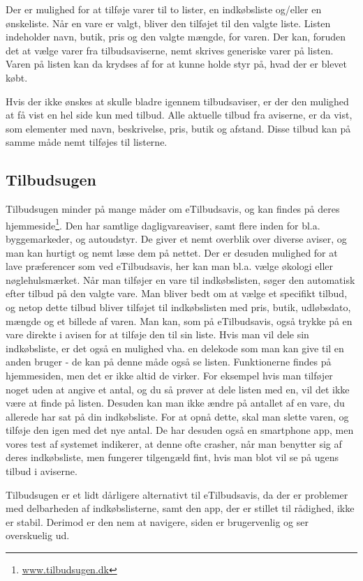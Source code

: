 Der er mulighed for at tilføje varer til to lister, en indkøbsliste og/eller en ønskeliste.
Når en vare er valgt, bliver den tilføjet til den valgte liste.
Listen indeholder navn, butik, pris og den valgte mængde, for varen.
Der kan, foruden det at vælge varer fra tilbudsaviserne, nemt skrives generiske varer på listen. Varen på listen kan da krydses af for at kunne holde styr på, hvad der er blevet købt.

Hvis der ikke ønskes at skulle bladre igennem tilbudsaviser, er der den mulighed at få vist en hel side kun med tilbud.
Alle aktuelle tilbud fra aviserne, er da vist, som elementer med navn, beskrivelse, pris, butik og afstand. 
Disse tilbud kan på samme måde nemt tilføjes til listerne.

\subsection{Tilbudsugen}
Tilbudsugen minder på mange måder om eTilbudsavis, og kan findes på deres hjemmeside\footnote{\underline{www.tilbudsugen.dk}}.
Den har samtlige dagligvareaviser, samt flere inden for bl.a. byggemarkeder, og autoudstyr.
De giver et nemt overblik over diverse aviser, og man kan hurtigt og nemt læse dem på nettet.
Der er desuden mulighed for at lave præferencer som ved eTilbudsavis, her kan man bl.a. vælge økologi eller nøglehulsmærket.
Når man tilføjer en vare til indkøbslisten, søger den automatisk efter tilbud på den valgte vare.
Man bliver bedt om at vælge et specifikt tilbud, og netop dette tilbud bliver tilføjet til indkøbslisten med pris, butik, udløbsdato, mængde og et billede af varen.
Man kan, som på eTilbudsavis, også trykke på en vare direkte i avisen for at tilføje den til sin liste.
Hvis man vil dele sin indkøbsliste, er det også en mulighed vha. en delekode som man kan give til en anden bruger - de kan på denne måde også se listen.
Funktionerne findes på hjemmesiden, men det er ikke altid de virker.
For eksempel hvis man tilføjer noget uden at angive et antal, og du så prøver at dele listen med en, vil det ikke være at finde på listen.
Desuden kan man ikke ændre på antallet af en vare, du allerede har sat på din indkøbsliste.
For at opnå dette, skal man slette varen, og tilføje den igen med det nye antal.
De har desuden også en smartphone app, men vores test af systemet indikerer, at denne ofte crasher, når man benytter sig af deres indkøbsliste, men fungerer tilgengæld fint, hvis man blot vil se på ugens tilbud i aviserne.

Tilbudsugen er et lidt dårligere alternativt til eTilbudsavis, da der er problemer med delbarheden af indkøbslisterne, samt den app, der er stillet til rådighed, ikke er stabil.
Derimod er den nem at navigere, siden er brugervenlig og ser overskuelig ud.

